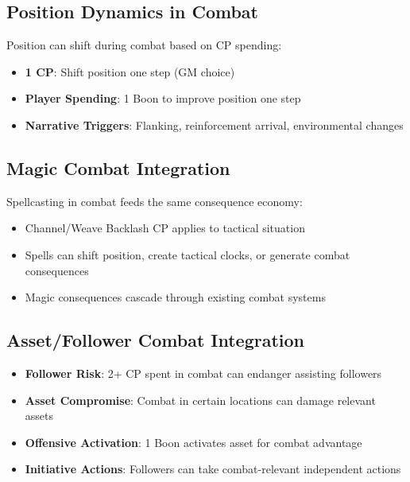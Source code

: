 \subsection{Position Dynamics in Combat}

Position can shift during combat based on CP spending:

\begin{itemize}
    \item \textbf{1 CP}: Shift position one step (GM choice)
    \item \textbf{Player Spending}: 1 Boon to improve position one step
    \item \textbf{Narrative Triggers}: Flanking, reinforcement arrival, environmental changes
\end{itemize}

\subsection{Magic Combat Integration}

Spellcasting in combat feeds the same consequence economy:

\begin{itemize}
    \item Channel/Weave Backlash CP applies to tactical situation
    \item Spells can shift position, create tactical clocks, or generate combat consequences
    \item Magic consequences cascade through existing combat systems
\end{itemize}

\subsection{Asset/Follower Combat Integration}

\begin{itemize}
    \item \textbf{Follower Risk}: 2+ CP spent in combat can endanger assisting followers
    \item \textbf{Asset Compromise}: Combat in certain locations can damage relevant assets  
    \item \textbf{Offensive Activation}: 1 Boon activates asset for combat advantage
    \item \textbf{Initiative Actions}: Followers can take combat-relevant independent actions
\end{itemize}

